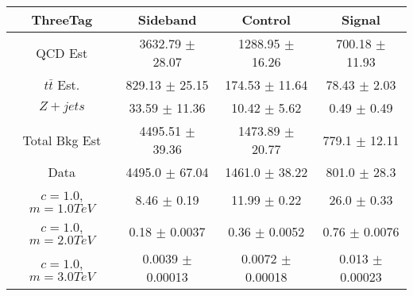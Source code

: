 \begin{footnotesize} 
\begin{tabular}{c|c|c|c} 
ThreeTag & Sideband & Control & Signal \\ 
\hline\hline 
QCD Est & 3632.79 $\pm$ 28.07 & 1288.95 $\pm$ 16.26 & 700.18 $\pm$ 11.93\\ 
$t\bar{t}$ Est.  & 829.13 $\pm$ 25.15 & 174.53 $\pm$ 11.64 & 78.43 $\pm$ 2.03\\ 
$Z+jets$ & 33.59 $\pm$ 11.36 & 10.42 $\pm$ 5.62 & 0.49 $\pm$ 0.49\\ 
Total Bkg Est & 4495.51 $\pm$ 39.36 & 1473.89 $\pm$ 20.77 & 779.1 $\pm$ 12.11\\ 
Data & 4495.0 $\pm$ 67.04 & 1461.0 $\pm$ 38.22 & 801.0 $\pm$ 28.3\\ 
$c=1.0$,$m=1.0TeV$ & 8.46 $\pm$ 0.19 & 11.99 $\pm$ 0.22 & 26.0 $\pm$ 0.33\\ 
$c=1.0$,$m=2.0TeV$ & 0.18 $\pm$ 0.0037 & 0.36 $\pm$ 0.0052 & 0.76 $\pm$ 0.0076\\ 
$c=1.0$,$m=3.0TeV$ & 0.0039 $\pm$ 0.00013 & 0.0072 $\pm$ 0.00018 & 0.013 $\pm$ 0.00023\\ 
\hline\hline 
\end{tabular} 
\end{footnotesize} 
\newline 

